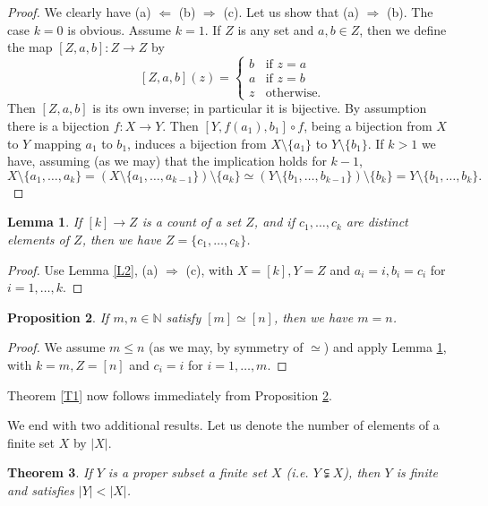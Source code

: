 \documentclass[12pt,letterpaper]{article}
\newtheorem{thm}{Theorem}%
\newtheorem{lem}[thm]{Lemma}
\newtheorem{prop}[thm]{Proposition}
\newcommand{\N}{\mathbb N}
\begin{document}
\begin{proof}
We clearly have (a) $\Leftarrow$ (b) $\Rightarrow$ (c). Let us show that (a) $\Rightarrow$ (b). The case $k=0$ is obvious. Assume $k=1$. If $Z$ is any set and $a,b\in Z$, then we define the map $[Z,a,b]:Z\to Z$ by 
\begin{equation}\label{E}
[Z,a,b](z)=
\begin{cases}
b&\text{if }z=a\\ 
a&\text{if }z=b\\ 
z&\text{otherwise.}
\end{cases}
\end{equation} 
Then $[Z,a,b]$ is its own inverse; in particular it is bijective. By assumption there is a bijection $f:X\to Y$. Then $[Y,f(a_1),b_1]\circ f$, being a bijection from $X$ to $Y$ mapping $a_1$ to $b_1$, induces a bijection from $X\setminus\{a_1\}$ to $Y\setminus\{b_1\}$. If $k>1$ we have, assuming (as we may) that the implication holds for $k-1$, 
$$
X\setminus\{a_1,\ldots, a_k\}=(X\setminus\{a_1,\ldots, a_{k-1}\})\setminus\{a_k\}\simeq(Y\setminus\{b_1,\ldots, b_{k-1}\})\setminus\{b_k\}= Y\setminus\{b_1,\ldots, b_k\}.
$$ 
\end{proof}

\begin{lem}\label{L3} 
If $[k]\to Z$ is a count of a set $Z$, and if $c_1,\ldots,c_k$ are distinct elements of $Z$, then we have $Z=\{c_1,\ldots,c_k\}$. 
\end{lem} 

\begin{proof}
Use Lemma \ref{L2}, (a) $\Rightarrow$ (c), with $X=[k],Y=Z$ and $a_i=i,b_i=c_i$ for $i=1,\ldots,k$. 
\end{proof}

\begin{prop}\label{P}
If $m,n\in\N$ satisfy $[m]\simeq[n]$, then we have $m=n$. 
\end{prop} 

\begin{proof}
We assume $m\le n$ (as we may, by symmetry of $\simeq$) and apply Lemma \ref{L3}, with $k=m,Z=[n]$ and $c_i=i$ for $i=1, \ldots, m$. 
\end{proof} 

Theorem \ref{T1} now follows immediately from Proposition \ref{P}. 

We end with two additional results. Let us denote the number of elements of a finite set $X$ by $|X|$. 

\begin{thm}\label{T5}
If $Y$ is a proper subset a finite set $X$ (i.e. $Y\subsetneqq X$), then $Y$ is finite and satisfies $|Y|<|X|$. 
\end{thm} 
\end{document}
